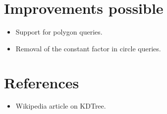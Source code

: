 \documentclass[11pt]{article}
\begin{document}
\section{Improvements possible}
	\begin{itemize}
		\item Support for polygon queries.
		\item Removal of the constant factor in circle queries.
	\end{itemize}

\section{References}
	\begin{itemize}
		\item Wikipedia article on KDTree.
	\end{itemize}
\end{document}

